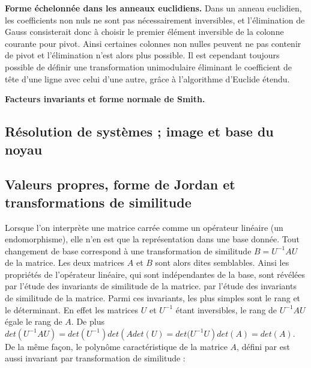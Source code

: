 \begin{flushleft}
\textbf{Forme échelonnée dans les anneaux euclidiens.} Dans un anneau euclidien, les coefficients non nuls ne sont pas nécessairement inversibles, et l’élimination de Gauss consisterait donc à choisir le premier élément inversible de la colonne courante pour pivot. Ainsi certaines colonnes non nulles peuvent ne pas contenir
de pivot et l’élimination n’est alors plus possible. Il est cependant toujours possible de définir une transformation unimodulaire éliminant le coefficient de tête d’une ligne avec celui d’une autre, grâce à
l’algorithme d’Euclide étendu.
\end{flushleft}

\begin{flushleft}
\textbf{Facteurs invariants et forme normale de Smith.}
\end{flushleft}

\subsection{ Résolution de systèmes ; image et base du noyau}
\subsection{Valeurs propres, forme de Jordan et transformations de similitude}
Lorsque l’on interprète une matrice carrée comme un opérateur linéaire (un endomorphisme), elle n’en est que la représentation dans une base donnée. Tout changement de base correspond à une transformation de similitude 
$B = U^{-1}AU$ de la matrice. Les deux matrices $A$ et $B$ sont alors dites semblables. Ainsi les propriétés de l’opérateur linéaire, qui sont indépendantes de la base, sont révélées par l’étude des invariants de similitude de la matrice.
par l’étude des invariants de similitude de la matrice. Parmi ces invariants, les plus simples sont le rang et le déterminant. En effet les matrices $U$ et $U^{-1}$ étant inversibles, le rang de $U^{-1}AU$ égale le rang de $A$. De plus $det\left( U^{-1}AU\right)  = det\left( U^{-1}\right) det \left(A det(U) = det(U^{-1}U\right) det\left( A\right) = det\left(A\right)$. De
la même façon, le polynôme caractéristique de la matrice $A$, défini par 
 est aussi invariant par transformation de similitude :
%

